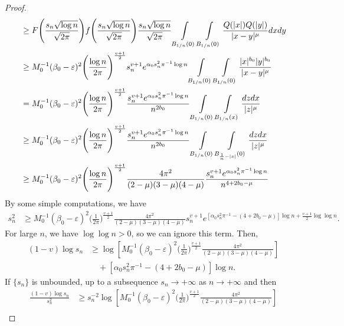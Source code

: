 \documentclass[11pt]{amsart}
\numberwithin{equation}{section}
\newcommand{\1}{\frac{1}{2}}
\begin{document}
\begin{proof}
\begin{align}
			& \geq F\Bigg( \frac{s_n \sqrt{\log{n}}}{\sqrt{2\pi}}\Bigg) f\Bigg( \frac{s_n \sqrt{\log{n}}}{\sqrt{2\pi}}\Bigg) \frac{s_n \sqrt{\log{n}}}{\sqrt{2\pi}} \int\limits\limits_{B_{1/n}(0)} \int\limits\limits_{B_{1/n}(0)} \frac{Q(|x|)Q(|y|)}{|x-y|^\mu}dxdy\nonumber\\
			& \geq M_0^{-1}(\beta_0-\varepsilon)^2 \Bigg( \frac{\log{n}}{2\pi}\Bigg)^{\frac{v+1}{2}} s_n^{v+1} e^{\alpha_0 s_n^2 \pi^{-1}\log{n}} \int\limits\limits_{B_{1/n}(0)} \int\limits\limits_{B_{1/n}(0)} \frac{|x|^{b_0} |y|^{b_0}}{|x-y|^\mu}\nonumber\\
			& = M_0^{-1}(\beta_0-\varepsilon)^2  \Bigg( \frac{\log{n}}{2\pi}\Bigg)^{\frac{v+1}{2}} \frac{s_n^{v+1} e^{\alpha_0 s_n^2 \pi^{-1}\log{n}}}{n^{2b_0}} \int\limits\limits_{B_{1/n}(0)} \int\limits\limits_{B_{1/n}(x)} \frac{dzdx}{|z|^\mu}\nonumber\\
			& \geq M_0^{-1}(\beta_0-\varepsilon)^2 \Bigg( \frac{\log{n}}{2\pi}\Bigg)^{\frac{v+1}{2}} \frac{s_n^{v+1} e^{\alpha_0 s_n^2 \pi^{-1}\log{n}}}{n^{2b_0}} \int\limits\limits_{B_{1/n}(0)} \int\limits\limits_{B_{\frac{1}{n}-|x|}(0)} \frac{dzdx}{|z|^\mu}\nonumber\\
			& \geq M_0^{-1}(\beta_0-\varepsilon)^2 \Bigg( \frac{\log{n}}{2\pi}\Bigg)^{\frac{v+1}{2}} \frac{4\pi^2}{(2-\mu)(3-\mu)(4-\mu)} \frac{s_n^{v+1} e^{\alpha_0 s_n^2 \pi^{-1}\log{n}}}{n^{4+2b_0-\mu}} \nonumber
		\end{align}
		By some simple computations, we have
		\begin{align}
			s_n^2	& \geq  M_0^{-1}(\beta_0-\varepsilon)^2 \Bigg( \frac{1}{2\pi}\Bigg)^{\frac{v+1}{2}} \frac{4\pi^2}{(2-\mu)(3-\mu)(4-\mu)} s_n^{v+1} e^{[\alpha_0 s_n^2 \pi^{-1}-(4+2b_0-\mu)]\log{n}+ \frac{v+1}{2}\log\log{n}}. \label{7}
		\end{align}
		For large $n$, we have $\log\log{n}>0$, so we can ignore this term. Then,
		\begin{align}
			(1-v)\log{s_n} & \geq  \log\left[M_0^{-1}(\beta_0-\varepsilon)^2 \Bigg( \frac{1}{2\pi}\Bigg)^{\frac{v+1}{2}} \frac{4\pi^2}{(2-\mu)(3-\mu)(4-\mu)} \right] \nonumber \\
			& \quad+ [\alpha_0 s_n^2 \pi^{-1}-(4+2b_0-\mu)]\log{n}. \label{8}
		\end{align}
		If $\{s_n\}$ is unbounded, up to a subsequence $s_n \rightarrow +\infty$ as $n\rightarrow +\infty$ and then 
		\begin{align}
			\frac{(1-v)\log s_n }{s_n^2} & \geq s_n^{-2} \log\left[M_0^{-1}(\beta_0-\varepsilon)^2 \Bigg( \frac{1}{2\pi}\Bigg)^{\frac{v+1}{2}} \frac{4\pi^2}{(2-\mu)(3-\mu)(4-\mu)} \right] \nonumber \\

\end{align}
\end{proof}
\end{document}
